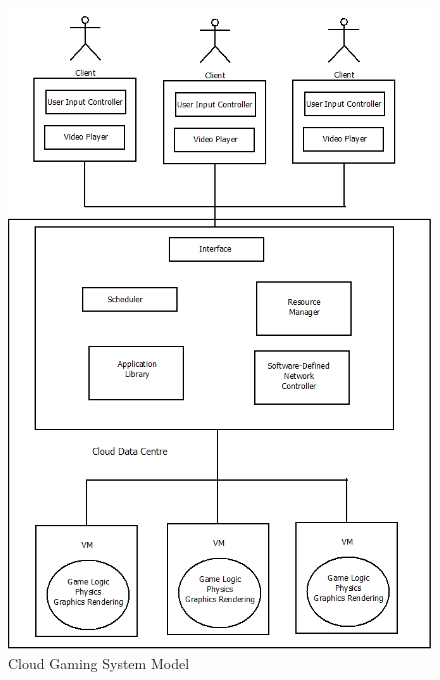 \clearpage
\begin{figure}[h]
 \centering
 \includegraphics[width=0.8\linewidth]{images/cloudsystemmodel.png}
 \caption{Cloud Gaming System Model}
 \label{fig:cloudmodel}
\end{figure}


